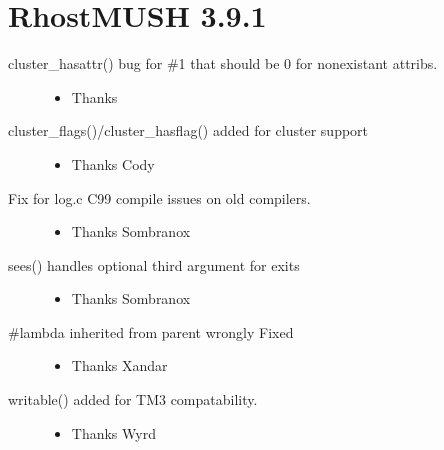\documentclass[letterpaper,10pt,english]{sphinxmanual}
\begin{document}
\section{RhostMUSH 3.9.1}
\label{\detokenize{changelog:rhostmush-3-9-1}}\label{\detokenize{changelog:changelog-3-9-1}}\begin{description}
\item[{cluster\_hasattr() bug for \#\sphinxhyphen{}1 that should be 0 for non\sphinxhyphen{}existant attribs.}] \leavevmode\begin{itemize}
\item {} 
\sphinxAtStartPar
Thanks 

\end{itemize}

\item[{cluster\_flags()/cluster\_hasflag() added for cluster support}] \leavevmode\begin{itemize}
\item {} 
\sphinxAtStartPar
Thanks Cody

\end{itemize}

\item[{Fix for log.c C99 compile issues on old compilers.}] \leavevmode\begin{itemize}
\item {} 
\sphinxAtStartPar
Thanks Sombranox

\end{itemize}

\item[{sees() handles optional third argument for exits}] \leavevmode\begin{itemize}
\item {} 
\sphinxAtStartPar
Thanks Sombranox

\end{itemize}

\item[{\#lambda inherited from parent wrongly \sphinxhyphen{} Fixed}] \leavevmode\begin{itemize}
\item {} 
\sphinxAtStartPar
Thanks Xandar

\end{itemize}

\item[{writable() added for TM3 compatability.}] \leavevmode\begin{itemize}
\item {} 
\sphinxAtStartPar
Thanks Wyrd


\end{itemize}
\end{description}
\end{document}
